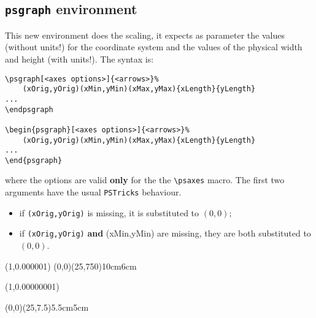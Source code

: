 \subsection{\texttt{psgraph} environment}
This new environment does the scaling, it expects as parameter the values (without units!) for the
coordinate system and the values of the physical width and height (with units!). The syntax is:

\begin{verbatim}
\psgraph[<axes options>]{<arrows>}%
    (xOrig,yOrig)(xMin,yMin)(xMax,yMax){xLength}{yLength}
...
\endpsgraph

\begin{psgraph}[<axes options>]{<arrows>}%
    (xOrig,yOrig)(xMin,yMin)(xMax,yMax){xLength}{yLength}
...
\end{psgraph}
\end{verbatim}

where the options are valid \textbf{only} for the the \verb+\psaxes+ macro. The first
two arguments have the usual \verb+PSTricks+ behaviour.
\begin{itemize}
  \item if \verb+(xOrig,yOrig)+ is missing, it is substituted to $(0,0)$;
  \item if \verb+(xOrig,yOrig)+ \textbf{and} (xMin,yMin) are missing, they are both 
	substituted to $(0,0)$.
\end{itemize}


\begin{LTXexample}[pos=t,preset=\centering]
\pstScalePoints(1,0.000001){}{}%
\psgraph[axesstyle=frame,xticksize=0 759,yticksize=0 25,%
    subticks=0,ylabelFactor={\cdot 10^6},%
    Dx=5,dy=100\psyunit,Dy=100](0,0)(25,750){10cm}{6cm} %
   \listplot[linecolor=red, linewidth=2pt, showpoints=true]{\data}
\endpsgraph
\end{LTXexample}


\begin{LTXexample}[width=7cm]
\pstScalePoints(1,0.00000001){}{}
\begin{psgraph}[axesstyle=frame,xticksize=0 7.5,yticksize=0 25,subticksize=1,%
     ylabelFactor={\cdot 10^8},Dx=5,Dy=1,xsubticks=2](0,0)(25,7.5){5.5cm}{5cm}
  \listplot[linecolor=red, linewidth=2pt, showpoints=true]{\data}
\end{psgraph}
\end{LTXexample}


